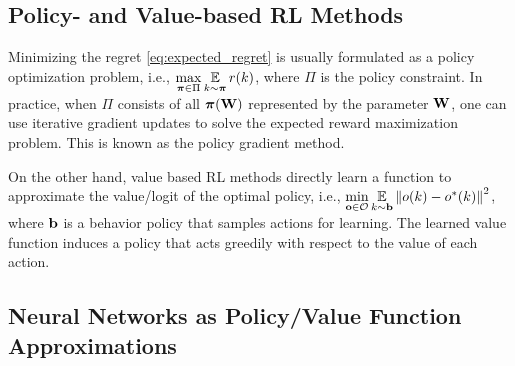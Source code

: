 
\subsection{Policy- and Value-based RL Methods}

Minimizing the regret \cref{eq:expected_regret} is usually formulated as a policy optimization problem, i.e., $\max\limits_{{\boldsymbol{\pi}} \in \Pi}{ \operatorname*{{\mathbb{E}}}\limits_{ k \sim {\boldsymbol{\pi}} }{ r(k)} }$, where $\Pi$ is the policy constraint. In practice, when $\Pi$ consists of all ${\boldsymbol{\pi}}({\mathbf{W}})$ represented by the parameter ${\mathbf{W}}$, one can use iterative gradient updates to solve the expected reward maximization problem. This is known as the policy gradient method.

On the other hand, value based RL methods directly learn a function to approximate the value/logit of the optimal policy, i.e., $\min\limits_{{\mathbf{o}} \in {\mathcal{O}}}{ \operatorname*{{\mathbb{E}}}\limits_{k \sim {\mathbf{b}}}{ \left\| o(k) - o^*(k) \right\|^2 }}$, where ${\mathbf{b}}$ is a behavior policy that samples actions for learning. The learned value function induces a policy that acts greedily with respect to the value of each action.

\subsection{Neural Networks as Policy/Value Function Approximations}
\label{subsec:nn_value_policy}
 


